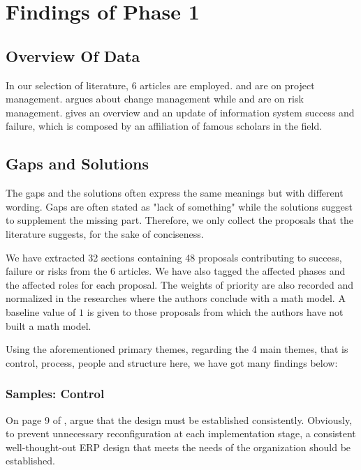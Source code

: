 
\section{Findings of Phase 1}

\subsection{Overview Of Data}
In our selection of literature, 6 articles are employed.  and  are on project management.  argues about change management while  and  are on risk management.  gives an overview and an update of information system success and failure, which is composed by an affiliation of famous scholars in the field.

\subsection{Gaps and Solutions}

The gaps and the solutions often express the same meanings but with different wording. Gaps are often stated as "lack of something" while the solutions suggest to supplement the missing part. Therefore, we only collect the proposals that the literature suggests, for the sake of conciseness.

We have extracted 32 sections containing 48 proposals contributing to success, failure or risks from the 6 articles. We have also tagged the affected phases and the affected roles for each proposal. The weights of priority are also recorded and normalized in the researches where the authors conclude with a math model. A baseline value of $1$ is given to those proposals from which the authors have not built a math model.

Using the aforementioned primary themes, regarding the 4 main themes, that is control, process, people and structure here, we have got many findings below:

\subsubsection{Samples: Control}

On page 9 of , \citeauthor{3} argue that the design must be established consistently. Obviously, to prevent unnecessary reconfiguration at each implementation stage, a consistent well-thought-out ERP design that meets the needs of the organization should be established.

